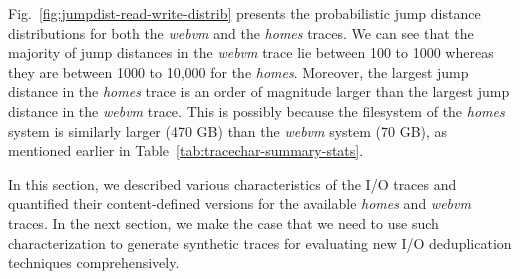 Fig.~\ref{fig:jumpdist-read-write-distrib} presents the probabilistic jump
distance distributions for both the \textit{webvm} and the \textit{homes} traces.
We can see that the majority of jump distances in the \textit{webvm} trace lie
between 100 to 1000 whereas they are between 1000 to 10,000 for the \textit{homes}.
Moreover, the largest jump distance in the \textit{homes} trace is an order of magnitude
larger than the largest jump distance in the \textit{webvm} trace. This is possibly
because the filesystem of the \textit{homes} system is similarly 
larger (470 GB) than the \textit{webvm} system (70 GB),
as mentioned earlier in Table~\ref{tab:tracechar-summary-stats}.

In this section, we described various characteristics of the I/O traces and 
quantified their content-defined versions for the available \textit{homes} and
\textit{webvm} traces. In the next section, we make the case that we need to
use such characterization to generate synthetic traces for evaluating new
I/O deduplication techniques comprehensively.
